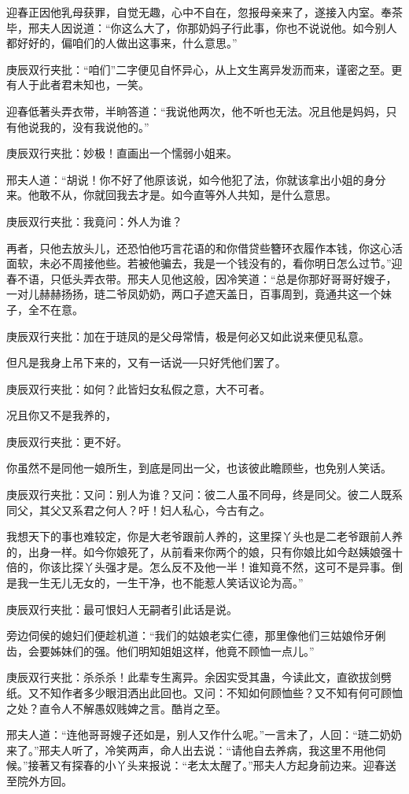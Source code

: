 \begin{parag}
    迎春正因他乳母获罪，自觉无趣，心中不自在，忽报母亲来了，遂接入内室。奉茶毕，邢夫人因说道：“你这么大了，你那奶妈子行此事，你也不说说他。如今别人都好好的，偏咱们的人做出这事来，什么意思。”\begin{note}庚辰双行夹批：“咱们”二字便见自怀异心，从上文生离异发沥而来，谨密之至。更有人于此者君未知也，一笑。\end{note}迎春低著头弄衣带，半晌答道：“我说他两次，他不听也无法。况且他是妈妈，只有他说我的，没有我说他的。”\begin{note}庚辰双行夹批：妙极！直画出一个懦弱小姐来。\end{note}邢夫人道：“胡说！你不好了他原该说，如今他犯了法，你就该拿出小姐的身分来。他敢不从，你就回我去才是。如今直等外人共知，是什么意思。\begin{note}庚辰双行夹批：我竟问：外人为谁？\end{note}再者，只他去放头儿，还恐怕他巧言花语的和你借贷些簪环衣履作本钱，你这心活面软，未必不周接他些。若被他骗去，我是一个钱没有的，看你明日怎么过节。”迎春不语，只低头弄衣带。邢夫人见他这般，因冷笑道：“总是你那好哥哥好嫂子，一对儿赫赫扬扬，琏二爷凤奶奶，两口子遮天盖日，百事周到，竟通共这一个妹子，全不在意。\begin{note}庚辰双行夹批：加在于琏凤的是父母常情，极是何必又如此说来便见私意。\end{note}但凡是我身上吊下来的，又有一话说──只好凭他们罢了。\begin{note}庚辰双行夹批：如何？此皆妇女私假之意，大不可者。\end{note}况且你又不是我养的，\begin{note}庚辰双行夹批：更不好。\end{note}你虽然不是同他一娘所生，到底是同出一父，也该彼此瞻顾些，也免别人笑话。\begin{note}庚辰双行夹批：又问：别人为谁？又问：彼二人虽不同母，终是同父。彼二人既系同父，其父又系君之何人？吁！妇人私心，今古有之。\end{note}我想天下的事也难较定，你是大老爷跟前人养的，这里探丫头也是二老爷跟前人养的，出身一样。如今你娘死了，从前看来你两个的娘，只有你娘比如今赵姨娘强十倍的，你该比探丫头强才是。怎么反不及他一半！谁知竟不然，这可不是异事。倒是我一生无儿无女的，一生干净，也不能惹人笑话议论为高。”\begin{note}庚辰双行夹批：最可恨妇人无嗣者引此话是说。\end{note}旁边伺侯的媳妇们便趁机道：“我们的姑娘老实仁德，那里像他们三姑娘伶牙俐齿，会要姊妹们的强。他们明知姐姐这样，他竟不顾恤一点儿。”\begin{note}庚辰双行夹批：杀杀杀！此辈专生离异。余因实受其蛊，今读此文，直欲拔剑劈纸。又不知作者多少眼泪洒出此回也。又问：不知如何顾恤些？又不知有何可顾恤之处？直令人不解愚奴贱婢之言。酷肖之至。\end{note}邢夫人道：“连他哥哥嫂子还如是，别人又作什么呢。”一言未了，人回：“琏二奶奶来了。”邢夫人听了，冷笑两声，命人出去说：“请他自去养病，我这里不用他伺候。”接著又有探春的小丫头来报说：“老太太醒了。”邢夫人方起身前边来。迎春送至院外方回。
\end{parag}


